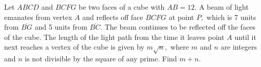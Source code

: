 Let $ABCD$ and $BCFG$ be two faces of a cube with $AB=12.$  A beam of light emanates from vertex $A$ and reflects off face $BCFG$ at point $P,$ which is 7 units from $\overline{BG}$ and 5 units from $\overline{BC}.$  The beam continues to be reflected off the faces of the cube.  The length of the light path from the time it leaves point $A$ until it next reaches a vertex of the cube is given by $m\sqrt{n},$ where $m$ and $n$ are integers and $n$ is not divisible by the square of any prime.  Find $m+n.$